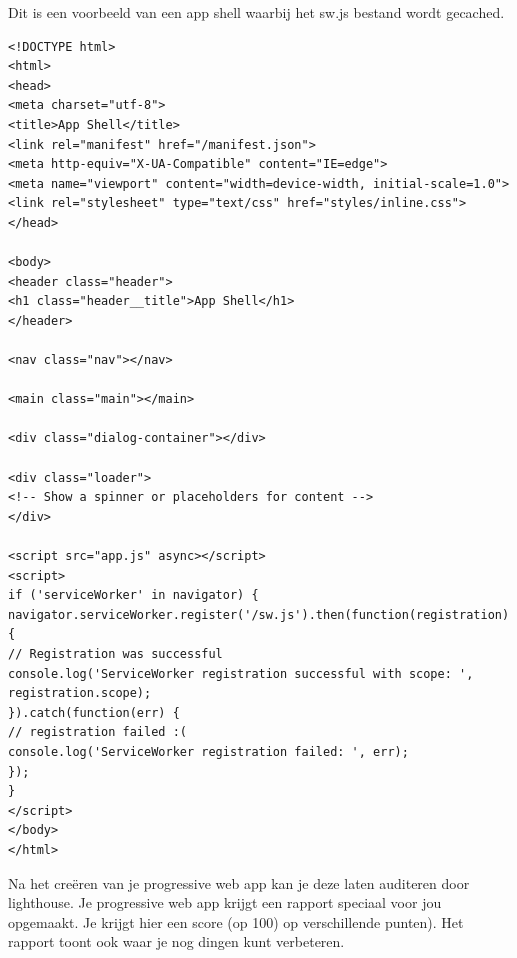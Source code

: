 Dit is een voorbeeld van een app shell waarbij het sw.js bestand wordt gecached. 


\begin{lstlisting}
<!DOCTYPE html>
<html>
<head>
<meta charset="utf-8">
<title>App Shell</title>
<link rel="manifest" href="/manifest.json">
<meta http-equiv="X-UA-Compatible" content="IE=edge">
<meta name="viewport" content="width=device-width, initial-scale=1.0">
<link rel="stylesheet" type="text/css" href="styles/inline.css">
</head>

<body>
<header class="header">
<h1 class="header__title">App Shell</h1>
</header>

<nav class="nav"></nav>

<main class="main"></main>

<div class="dialog-container"></div>

<div class="loader">
<!-- Show a spinner or placeholders for content -->
</div>

<script src="app.js" async></script>
<script>
if ('serviceWorker' in navigator) {
navigator.serviceWorker.register('/sw.js').then(function(registration) {
// Registration was successful
console.log('ServiceWorker registration successful with scope: ', registration.scope);
}).catch(function(err) {
// registration failed :(
console.log('ServiceWorker registration failed: ', err);
});
}
</script>
</body>
</html>
\end{lstlisting}


Na het creëren van je progressive web app kan je deze laten auditeren door lighthouse. Je progressive web app krijgt een rapport speciaal voor jou opgemaakt. Je krijgt hier een score (op 100) op verschillende punten). Het rapport toont ook waar je nog dingen kunt verbeteren.


